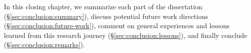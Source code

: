 In this closing chapter, we summarize each part of the dissertation (\S\ref{sec:conclusion:summary}), discuss potential future work directions (\S\ref{sec:conclusion:future-work}), comment on general experiences and lessons learned from this research journey (\S\ref{sec:conclusion:lessons}), and finally conclude (\S\ref{sec:conclusion:remarks}).
